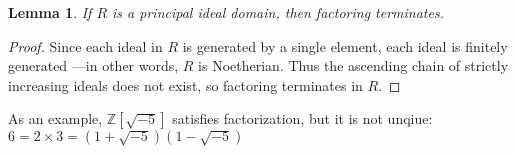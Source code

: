 \documentclass[11pt]{article}
\newtheorem{lemma}{Lemma}
\begin{document}
\begin{adjustwidth}{0.5cm}{}
  \begin{lemma}
    If $R$ is a principal ideal domain, then factoring terminates.
  \end{lemma}
  \begin{proof}
    Since each ideal in $R$ is generated by a single element, each ideal is finitely generated ---in other words, $R$ is Noetherian. Thus the ascending chain of strictly increasing ideals does not exist, so factoring terminates in $R$.
  \end{proof}
\end{adjustwidth}

As an example, $\mathbb{Z} [\sqrt{-5}]$ satisfies factorization, but it is not unqiue: $6 = 2 \times 3 = (1 + \sqrt{-5})(1 - \sqrt{-5})$



\end{document}
